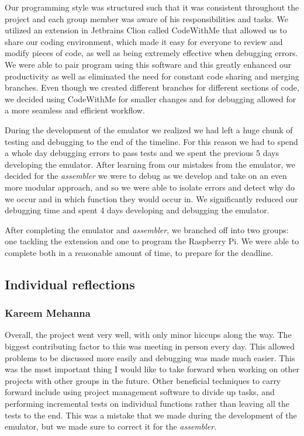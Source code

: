 \documentclass[11pt]{article}
\begin{document}
Our programming style was structured such that it was consistent throughout the project and each group member was aware of his responsibilities and tasks. We utilized an extension in Jetbrains Clion called CodeWithMe that allowed us to share our coding environment, which made it easy for everyone to review and modify pieces of code, as well as being extremely effective when debugging errors. We were able to pair program using this software and this greatly enhanced our productivity as well as eliminated the need for constant code sharing and merging branches. Even though we created different branches for different sections of code, we decided using CodeWithMe for smaller changes and for debugging allowed for a more seamless and efficient workflow.

During the development of the emulator we realized we had left a huge chunk of testing and debugging to the end of the timeline. For this reason we had to spend a whole day debugging errors to pass tests and we spent the previous 5 days developing the emulator. After learning from our mistakes from the emulator, we decided for the {\it assembler} we were to debug as we develop and take on an even more modular approach, and so we were able to isolate errors and detect why do we occur and in which function they would occur in. We significantly reduced our debugging time and spent 4 days developing and debugging the emulator. 

After completing the emulator and {\it assembler}, we branched off into two groups: one tackling the extension and one to program the Raspberry Pi. We were able to complete both in a reasonable amount of time, to prepare for the deadline.
\subsection{Individual reflections}
\subsubsection*{Kareem Mehanna}
Overall, the project went very well, with only minor hiccups along the way. The biggest contributing factor to this was meeting in person every day. This allowed problems to be discussed more easily and debugging was made much easier. This was the most important thing I would like to take forward when working on other projects with other groups in the future. Other beneficial techniques to carry forward include using project management software to divide up tasks, and performing incremental tests on individual functions rather than leaving all the tests to the end. This was a mistake that we made during the development of the emulator, but we made sure to correct it for the {\it assembler}. 
\end{document}
